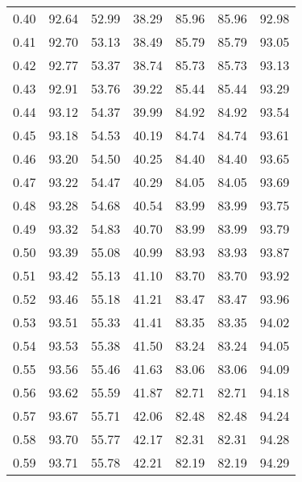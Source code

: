 \begin{tabular}{|c|c|c|c|c|c|c|}
      0.40 &     92.64 &     52.99 &      38.29 &   85.96 &      85.96 &         92.98 \\
      0.41 &     92.70 &     53.13 &      38.49 &   85.79 &      85.79 &         93.05 \\
      0.42 &     92.77 &     53.37 &      38.74 &   85.73 &      85.73 &         93.13 \\
      0.43 &     92.91 &     53.76 &      39.22 &   85.44 &      85.44 &         93.29 \\
      0.44 &     93.12 &     54.37 &      39.99 &   84.92 &      84.92 &         93.54 \\
      0.45 &     93.18 &     54.53 &      40.19 &   84.74 &      84.74 &         93.61 \\
      0.46 &     93.20 &     54.50 &      40.25 &   84.40 &      84.40 &         93.65 \\
      0.47 &     93.22 &     54.47 &      40.29 &   84.05 &      84.05 &         93.69 \\
      0.48 &     93.28 &     54.68 &      40.54 &   83.99 &      83.99 &         93.75 \\
      0.49 &     93.32 &     54.83 &      40.70 &   83.99 &      83.99 &         93.79 \\
      0.50 &     93.39 &     55.08 &      40.99 &   83.93 &      83.93 &         93.87 \\
      0.51 &     93.42 &     55.13 &      41.10 &   83.70 &      83.70 &         93.92 \\
      0.52 &     93.46 &     55.18 &      41.21 &   83.47 &      83.47 &         93.96 \\
      0.53 &     93.51 &     55.33 &      41.41 &   83.35 &      83.35 &         94.02 \\
      0.54 &     93.53 &     55.38 &      41.50 &   83.24 &      83.24 &         94.05 \\
      0.55 &     93.56 &     55.46 &      41.63 &   83.06 &      83.06 &         94.09 \\
      0.56 &     93.62 &     55.59 &      41.87 &   82.71 &      82.71 &         94.18 \\
      0.57 &     93.67 &     55.71 &      42.06 &   82.48 &      82.48 &         94.24 \\
      0.58 &     93.70 &     55.77 &      42.17 &   82.31 &      82.31 &         94.28 \\
      0.59 &     93.71 &     55.78 &      42.21 &   82.19 &      82.19 &         94.29 \\

\end{tabular}
